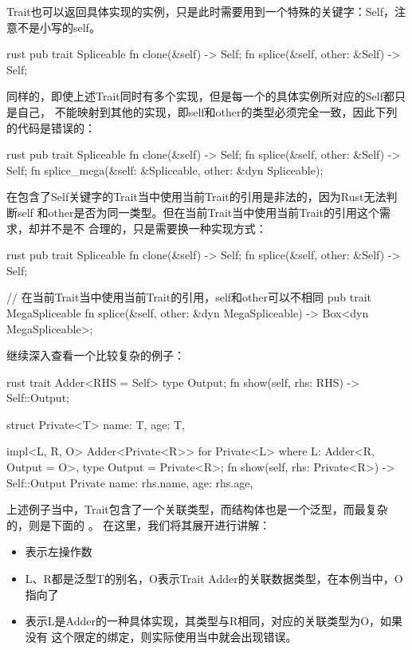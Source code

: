Trait也可以返回具体实现的实例，只是此时需要用到一个特殊的关键字：Self，注意不是小写的self。
\begin{code-block}{rust}
pub trait Spliceable {
    fn clone(&self) -> Self;
    fn splice(&self, other: &Self) -> Self;
}
\end{code-block}
同样的，即使上述Trait同时有多个实现，但是每一个的具体实例所对应的Self都只是自己，
不能映射到其他的实现，即self和other的类型必须完全一致，因此下列的代码是错误的：
\begin{code-block}{rust}
pub trait Spliceable {
    fn clone(&self) -> Self;
    fn splice(&self, other: &Self) -> Self;
    fn splice_mega(&self: &Spliceable, other: &dyn Spliceable);
}
\end{code-block}
在包含了Self关键字的Trait当中使用当前Trait的引用是非法的，因为Rust无法判断self
和other是否为同一类型。但在当前Trait当中使用当前Trait的引用这个需求，却并不是不
合理的，只是需要换一种实现方式：
\begin{code-block}{rust}
pub trait Spliceable {
    fn clone(&self) -> Self;
    fn splice(&self, other: &Self) -> Self;
}

// 在当前Trait当中使用当前Trait的引用，self和other可以不相同
pub trait MegaSpliceable {
    fn splice(&self, other: &dyn MegaSpliceable) -> Box<dyn MegaSpliceable>;
}
\end{code-block}

继续深入查看一个比较复杂的例子：
\begin{code-block}{rust}
trait Adder<RHS = Self> {
    type Output;
    fn show(self, rhs: RHS) -> Self::Output;
}

struct Private<T> {
    name: T,
    age: T,
}

impl<L, R, O> Adder<Private<R>> for Private<L>
where
    L: Adder<R, Output = O>,
{
    type Output = Private<R>;
    fn show(self, rhs: Private<R>) -> Self::Output {
        Private {
            name: rhs.name,
            age: rhs.age,
        }
    }
}
\end{code-block}
上述例子当中，Trait包含了一个关联类型，而结构体也是一个泛型，而最复杂的，则是下面的
。
在这里，我们将其展开进行讲解：
\begin{itemize}
  \item {}表示左操作数
  \item L、R都是泛型T的别名，O表示Trait Adder的关联数据类型，在本例当中，O指向了
  \item {}表示L是Adder的一种具体实现，其类型与R相同，对应的关联类型为O，如果没有
这个限定的绑定，则实际使用当中就会出现错误。
\end{itemize}

